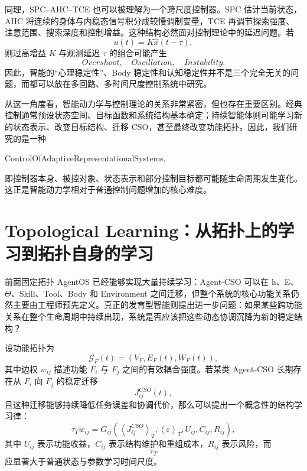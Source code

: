 同理，SPC--AHC--TCE 也可以被理解为一个跨尺度控制器。SPC 估计当前状态，AHC 将连续的身体与内稳态信号积分成较慢调制变量，TCE 再调节探索强度、注意范围、搜索深度和控制增益。这种结构必然面对控制理论中的延迟问题。若
\begin{equation}
u(t)
=
K\widehat{x}(t-\tau),
\end{equation}
则过高增益 $K$ 与观测延迟 $\tau$ 的组合可能产生
\begin{equation}
Overshoot,\quad Oscillation,\quad Instability.
\end{equation}
因此，智能的“心理稳定性”、Body 稳定性和认知稳定性并不是三个完全无关的问题，而都可以放在多回路、多时间尺度控制系统中研究。

从这一角度看，智能动力学与控制理论的关系非常紧密，但也存在重要区别。经典控制通常预设状态空间、目标函数和系统结构基本确定；持续智能体则可能学习新的状态表示、改变目标结构、迁移 CSO，甚至最终改变功能拓扑。因此，我们研究的是一种
\begin{statementbox}
ControlOfAdaptiveRepresentationalSystems,
\end{statementbox}
即控制器本身、被控对象、状态表示和部分控制目标都可能随生命周期发生变化。这正是智能动力学相对于普通控制问题增加的核心难度。

\section{Topological Learning：从拓扑上的学习到拓扑自身的学习}

前面固定拓扑 AgentOS 已经能够实现大量持续学习：Agent-CSO 可以在 h、E、$\Theta$、Skill、Tool、Body 和 Environment 之间迁移，但整个系统的核心功能关系仍然主要由工程师预先定义。真正的发育型智能则提出进一步问题：如果某些跨功能关系在整个生命周期中持续出现，系统是否应该把这些动态协调沉降为新的稳定结构？

设功能拓扑为
\begin{equation}
\mathcal{G}_{F}(t)
=
\left(
V_F,
E_F(t),
W_F(t)
\right),
\end{equation}
其中边权 $w_{ij}$ 描述功能 $F_i$ 与 $F_j$ 之间的有效耦合强度。若某类 Agent-CSO 长期存在从 $F_i$ 向 $F_j$ 的稳定迁移
\begin{equation}
J^{CSO}_{ij}(t),
\end{equation}
且这种迁移能够持续降低任务误差和协调代价，那么可以提出一个概念性的结构学习律：
\begin{equation}
\tau_T\dot w_{ij}
=
G_{ij}
\left(
\left\langle
J^{CSO}_{ij}
\right\rangle_T,
\left\langle
\varepsilon
\right\rangle_T,
U_{ij},
C_{ij},
R_{ij}
\right),
\end{equation}
其中 $U_{ij}$ 表示功能收益，$C_{ij}$ 表示结构维护和重组成本，$R_{ij}$ 表示风险，而
\begin{equation}
\tau_T
\end{equation}
应显著大于普通状态与参数学习时间尺度。

